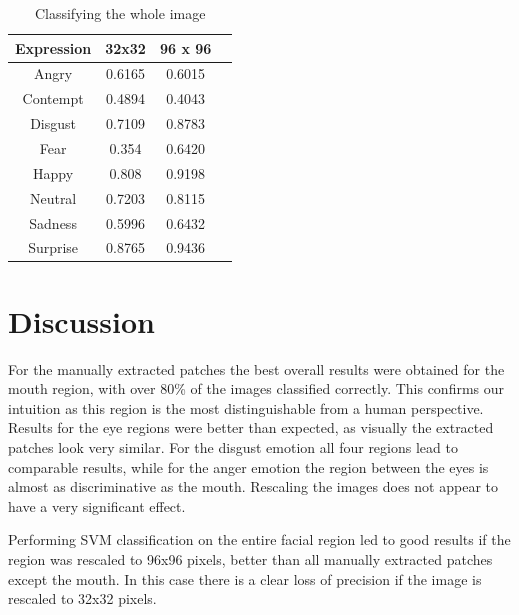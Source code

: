 \begin{table}
\caption{Classifying the whole image}
\label{table:entire_images}

\begin{tabular}{| c | c | c | c |}
\hline
Expression & 32x32 & 96 x 96  \\

\hline
Angry	 & 0.6165 & 0.6015	\\
Contempt & 0.4894 & 0.4043	\\
Disgust	 & 0.7109 & 0.8783	\\
Fear	 & 0.354  & 0.6420	\\
Happy	 & 0.808  & 0.9198	\\
Neutral	 & 0.7203 & 0.8115	\\
Sadness	 & 0.5996 & 0.6432	\\
Surprise & 0.8765 & 0.9436	\\

\hline
\end{tabular}
\end{table}

\section{Discussion}
For the manually extracted patches the best overall results were obtained for the mouth region, with over 80\% of the images classified correctly.
This confirms our intuition as this region is the most distinguishable
from a human perspective. Results for the eye regions were better than expected, as visually the extracted patches look very similar. For the disgust emotion all 
four regions lead to comparable results, while for the anger emotion the region between the eyes is almost as discriminative as the mouth. 
Rescaling the images does not appear to have a very significant effect. 

Performing SVM classification on the entire facial region led to good results if the region was rescaled to 96x96 pixels, better than all manually extracted 
patches except the mouth. In this case there is a clear loss
of precision if the image is rescaled to 32x32 pixels. %



